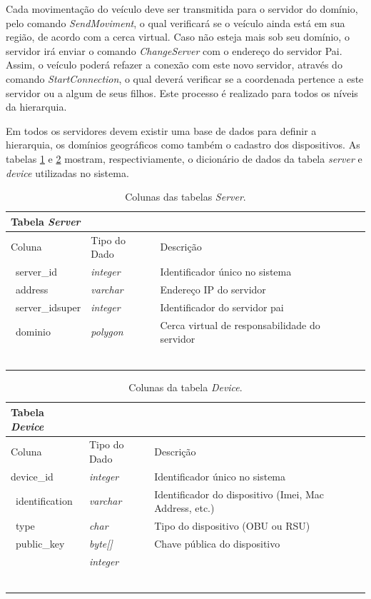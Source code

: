 \documentclass[
	12pt,				%
	oneside,			%
	a4paper,			%
	english,			%
	brazil				%
	]{abntex2ppgsi}
\begin{document}
Cada movimentação do veículo deve ser transmitida para o servidor do domínio, pelo comando \textit{SendMoviment}, o qual verificará se o veículo ainda está em sua região, de acordo com a cerca virtual. Caso não esteja mais sob seu domínio, o servidor irá enviar o comando \textit{ChangeServer} com o endereço do servidor Pai. Assim, o veículo poderá refazer a conexão com este novo servidor, através do comando \textit{StartConnection}, o qual deverá verificar se a coordenada pertence a este servidor ou a algum de seus filhos. Este processo é realizado para todos os níveis da hierarquia.

Em todos os servidores devem existir uma base de dados para definir a hierarquia, os domínios geográficos como também o cadastro dos dispositivos. As tabelas \ref{tab:serverTable} e \ref{tab:deviceTable} mostram, respectiviamente, o dicionário de dados da tabela \textit{server} e \textit{device} utilizadas no sistema.

\begin{longtable}{ p{}  p{}   p{}  p{}} 
	\hline
	\rowcolor[gray]{0.7}
	Tabela \textit{Server}	& 	&  \\ \hline
	\rowcolor[gray]{0.7}
	Coluna	& Tipo do Dado	& Descrição \\ \
	server\_id	& \textit{integer} & Identificador único no sistema 	\\ \
	address	& \textit{varchar}	& Endereço IP do servidor \\ \
	server\_idsuper	& \textit{integer} & Identificador do servidor pai 	\\ \	
	dominio	& \textit{polygon} & Cerca virtual de responsabilidade do servidor	\\ \	\\ \hline
	\caption{Colunas das tabelas \textit{Server}. } %
	\label{tab:serverTable}
\end{longtable}

\begin{longtable}{ p{.20\textwidth}  p{.15\textwidth}   p{.40\textwidth}  p{.20\textwidth}} 
	\hline
	\rowcolor[gray]{0.7}
	Tabela \textit{Device}	& 	&  \\ \hline
	\rowcolor[gray]{0.7}	
	Coluna	& Tipo do Dado	& Descrição \\ \hline
	device\_id	& \textit{integer} & Identificador único no sistema	\\ \
    identification	& \textit{varchar} & Identificador do dispositivo (Imei, Mac Address, etc.)	\\ \
    type	& \textit{char} & Tipo do dispositivo (OBU ou RSU)	\\ \
    public\_key	& \textit{byte[]} &  Chave pública do dispositivo	\\ \
		& \textit{integer} & 	\\ \	\\ \hline
	\caption{Colunas da tabela \textit{Device}. } %
	\label{tab:deviceTable}
\end{longtable}
\end{document}
